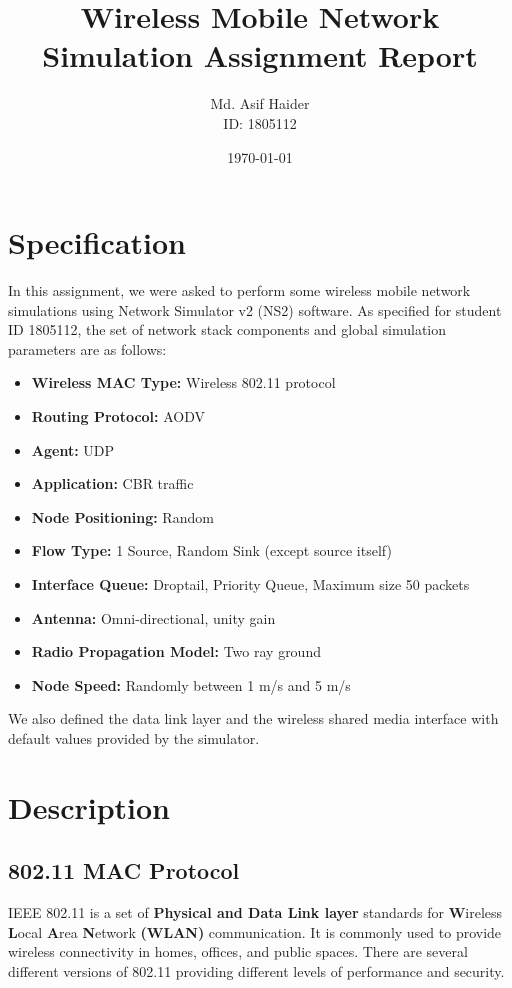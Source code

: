 \documentclass[24pt, a4paper]{article} %
\title{Wireless Mobile Network Simulation Assignment Report}
\author{Md. Asif Haider \\ 
ID: 1805112}
\date{\today}
\begin{document}
\maketitle
\pagebreak %

\tableofcontents
\pagebreak

\section{Specification}
\label{sec:intro} %
In this assignment, we were asked to perform some wireless mobile network simulations using Network Simulator v2 (NS2) software. As specified for student ID 1805112, the set of network stack components and global simulation parameters are as follows:

\begin{itemize}
    \item \textbf{Wireless MAC Type:} Wireless 802.11 protocol
    \item \textbf{Routing Protocol:} AODV
    \item \textbf{Agent:} UDP
    \item \textbf{Application:} CBR traffic 
    \item \textbf{Node Positioning:} Random
    \item \textbf{Flow Type:} 1 Source, Random Sink (except source itself)
    \item \textbf{Interface Queue:} Droptail, Priority Queue, Maximum size 50 packets
    \item \textbf{Antenna:} Omni-directional, unity gain
    \item \textbf{Radio Propagation Model:} Two ray ground
    \item \textbf{Node Speed:} Randomly between 1 m/s and 5 m/s
\end{itemize}
We also defined the data link layer and the wireless shared media interface with default values provided by the simulator.

\section{Description}
\subsection{802.11 MAC Protocol}

IEEE 802.11 is a set of \textbf{Physical and Data Link layer} standards for \textbf{W}ireless \textbf{L}ocal \textbf{A}rea \textbf{N}etwork \textbf{(WLAN)} communication. It is commonly used to provide wireless connectivity in homes, offices, and public spaces. There are several different versions of 802.11 providing different levels of performance and security. \\
\end{document}
